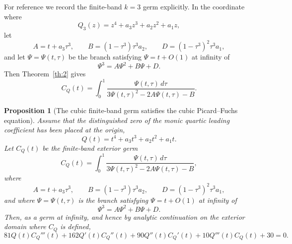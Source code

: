 \documentclass[10pt,twoside,a4paper,reqno]{amsart}
\theoremstyle{plain}
\newtheorem{pro}            {Proposition}
\theoremstyle{definition}
\theoremstyle{remark}
\newenvironment{proposition}{\begin{pro}}{\end{pro}}
\begin{document}
\medskip
For reference we record the finite-band $k=3$ germ explicitly.  In the coordinate
where
\[
        Q_3(z)=z^4+a_3z^3+a_2z^2+a_1z,
\]
let
\[
        A=t+a_3\tau^3,
        \qquad B=(1-\tau^3)\tau^3a_2,
        \qquad D=(1-\tau^3)^2\tau^3a_1,
\]
and let $\Psi=\Psi(t,\tau)$ be the branch satisfying $\Psi=t+O(1)$ at infinity of
\begin{equation}
\label{eq:k3-cubic-psi}
        \Psi^3=A\Psi^2+B\Psi+D .
\end{equation}
Then Theorem~\ref{th:2} gives
\begin{equation}
\label{eq:k3-finiteband-C}
        C_Q(t)=\int_0^1
        \frac{\Psi(t,\tau)\,d\tau}{3\Psi(t,\tau)^2-2A\Psi(t,\tau)-B}.
\end{equation}

\begin{proposition}[The cubic finite-band germ satisfies the cubic Picard--Fuchs equation]
\label{prop:k3-finiteband-pf}
Assume that the distinguished zero of the monic quartic leading coefficient has
been placed at the origin,
\[
        Q(t)=t^4+a_3t^3+a_2t^2+a_1t .
\]
Let \(C_Q(t)\) be the finite-band exterior germ
\[
        C_Q(t)=\int_0^1
        \frac{\Psi(t,\tau)\,d\tau}
        {3\Psi(t,\tau)^2-2A\Psi(t,\tau)-B},
\]
where
\[
        A=t+a_3\tau^3,\qquad
        B=(1-\tau^3)\tau^3a_2,\qquad
        D=(1-\tau^3)^2\tau^3a_1,
\]
and where \(\Psi=\Psi(t,\tau)\) is the branch satisfying
\(\Psi=t+O(1)\) at infinity of
\[
        \Psi^3=A\Psi^2+B\Psi+D .
\]
Then, as a germ at infinity, and hence by analytic continuation on the exterior
domain where \(C_Q\) is defined,
\begin{equation}
\label{eq:k3-finiteband-pf}
        81Q(t)C_Q'''(t)+162Q'(t)C_Q''(t)
        +90Q''(t)C_Q'(t)+10Q'''(t)C_Q(t)+30=0 .
\end{equation}
\end{proposition}
\end{document}
